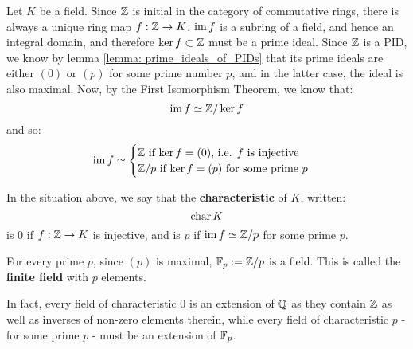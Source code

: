         Let $K$ be a field. Since $\mathbb{Z}$ is initial in the category of commutative rings, there is always a unique ring map $f: \mathbb{Z} \to K$. $\operatorname{im} f$ is a subring of a field, and hence an integral domain, and therefore $\ker f \subset \mathbb{Z}$ must be a prime ideal. Since $\mathbb{Z}$ is a PID, we know by lemma \ref{lemma: prime_ideals_of_PIDs} that its prime ideals are either $(0)$ or $(p)$ for some prime number $p$, and in the latter case, the ideal is also maximal. Now, by the First Isomorphism Theorem, we know that:
            $$\operatorname{im} f \simeq \mathbb{Z}/\ker f$$
        and so:
            $$
                \operatorname{im} f \simeq  
                \begin{cases}
                    \text{$\mathbb{Z}$ if $\ker f = (0)$, i.e. $f$ is injective}
                    \\
                    \text{$\mathbb{Z}/p$ if $\ker f = (p)$ for some prime $p$}
                \end{cases}
            $$
        \begin{definition} \label{def: characteristics_of_fields}
            In the situation above, we say that the \textbf{characteristic} of $K$, written:
                $$\operatorname{char} K$$
            is $0$ if $f: \mathbb{Z} \to K$ is injective, and is $p$ if $\operatorname{im} f \simeq \mathbb{Z}/p$ for some prime $p$.
        \end{definition}
        \begin{convention}
            For every prime $p$, since $(p)$ is maximal, $\mathbb{F}_p := \mathbb{Z}/p$ is a field. This is called the \textbf{finite field} with $p$ elements.
        \end{convention}
        \begin{remark}
            In fact, every field of characteristic $0$ is an extension of $\mathbb{Q}$ as they contain $\mathbb{Z}$ as well as inverses of non-zero elements therein, while every field of characteristic $p$ - for some prime $p$ - must be an extension of $\mathbb{F}_p$.
        \end{remark}
            
